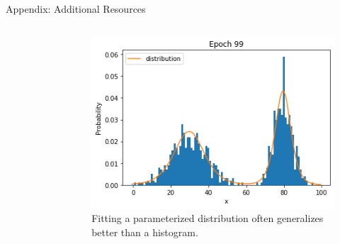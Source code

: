 \begin{frame}[allowframebreaks]{Appendix: Additional Resources}
\begin{columns}
\begin{column}{0.45\textwidth}
\begin{figure}
        \end{figure}
    \end{column}
    \begin{column}{0.55\textwidth}
       \begin{figure}
            \centering
            \includegraphics[width=\textwidth,keepaspectratio]{images/autoregressive/histogram_parameterised.png}
            \caption*{Fitting a parameterized distribution often generalizes better than a histogram.}
        \end{figure}
    \end{column}
\end{columns}
    
\end{frame}